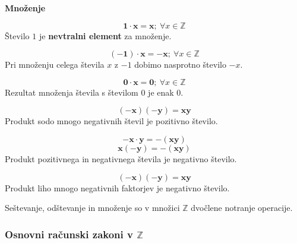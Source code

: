         \begin{frame}
            \textbf{\large{Množenje}}

            \begin{block}{}
                $$\mathbf{1\cdot x=x}; ~\forall x\in\mathbb{Z}$$
                Število $1$ je \textbf{nevtralni element} za množenje.
            \end{block}

            \begin{block}{}
                $$\mathbf{(-1)\cdot x=-x}; ~\forall x\in\mathbb{Z}$$
                Pri množenju celega števila $x$ z $-1$ dobimo nasprotno število $-x$.
            \end{block}

            \begin{block}{}
                $$\mathbf{0\cdot x=0}; ~\forall x\in\mathbb{Z}$$
                Rezultat množenja števila s številom $0$ je enak $0$.
            \end{block}

        \end{frame}

        \begin{frame}


            \begin{block}{}
                $$\mathbf{(-x)(-y)=xy}$$
                Produkt sodo mnogo negativnih števil je pozitivno število.
            \end{block}

            \begin{block}{}
                $$\mathbf{-x\cdot y=-(xy)}$$
                $$\mathbf{x(-y)=-(xy)}$$
                Produkt pozitivnega in negativnega števila je negativno število.
            \end{block}

            \begin{block}{}
                $$\mathbf{(-x)(-y)=xy}$$
                Produkt liho mnogo negativnih faktorjev je negativno število.
            \end{block}

            \begin{block}{}
                Seštevanje, odštevanje in množenje so v množici $\mathbb{Z}$ dvočlene notranje operacije.
            \end{block}
        \end{frame}


        \begin{frame}
            \frametitle{Osnovni računski zakoni v $\mathbb{Z}$}


        \end{frame}

